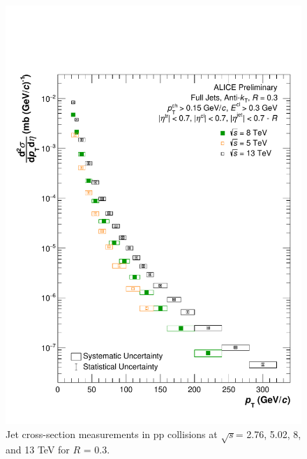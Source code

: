 \documentclass[ALICE]{ALICE_analysis_notes}
\newcommand{\s}{$\sqrt{s}$\xspace}
\newcommand{\pp}{pp\xspace}
\begin{document}
\begin{appendix}
\begin{figure}[h!]
    \centering
    \includegraphics[width=15cm]{figures/EnergyComparisons/SpectrumComparison_R03.pdf}
    \caption{Jet cross-section measurements in \pp collisions at \s = 2.76, 5.02, 8, and 13 TeV for $R$ = 0.3.}
    \label{fig:appSpecCompareR03}
\end{figure}


\end{appendix}
\end{document}
